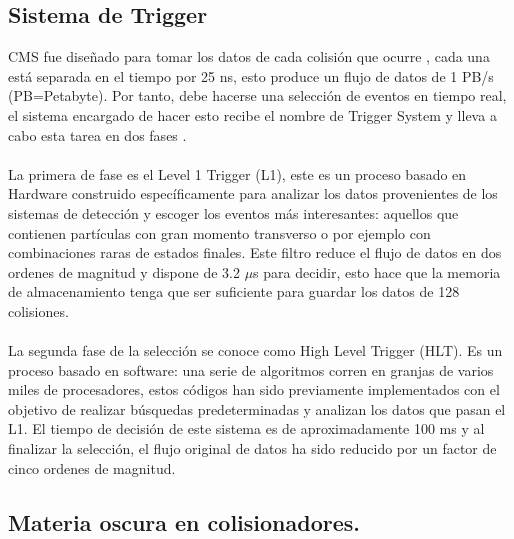 \subsection{Sistema de Trigger}

CMS fue diseñado para tomar los datos de cada colisión que ocurre	, cada una está separada en el tiempo por 25 ns, esto produce un flujo de datos de 1 PB/s (PB=Petabyte). Por tanto, debe hacerse una selección de eventos en tiempo real, el sistema encargado de hacer esto recibe el nombre de Trigger System y lleva a cabo esta tarea en dos fases \cite{CMSTrigger}. 
\\
\\
La primera de fase es el Level 1 Trigger (L1), este es un proceso basado en Hardware construido específicamente para analizar los datos provenientes de los sistemas de detección y escoger los eventos más interesantes: aquellos que contienen partículas con gran momento transverso o por ejemplo con combinaciones raras de estados finales. Este filtro reduce el flujo de datos en dos ordenes de magnitud y dispone de 3.2 $\mu$s para decidir, esto hace que la memoria de almacenamiento tenga que ser suficiente para guardar los datos de 128  colisiones.
\\
\\
La segunda fase de la selección se conoce como High Level Trigger (HLT). Es un proceso basado en software: una serie de algoritmos corren en granjas de varios miles de procesadores, estos códigos han sido previamente implementados con el objetivo de realizar búsquedas predeterminadas y analizan los datos que pasan el L1. El tiempo de decisión de este sistema es de aproximadamente 100 ms y al finalizar la selección, el flujo original de datos ha sido reducido por un factor de cinco ordenes de magnitud.

\subsection{Materia oscura en colisionadores.}


